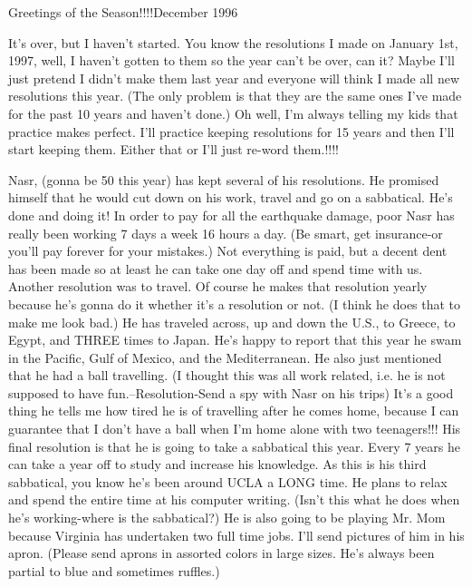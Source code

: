 
%

Greetings of the Season!!!!\hfill December 1996


It's over, but I haven't started. You know the resolutions I made on January 1st, 1997, well, I haven't gotten to them so the year can't be
over, can it? Maybe I'll just pretend I didn't make them last year and everyone will think I made all new resolutions this year. (The only
problem is that they are the same ones I've made for the past 10 years and haven't done.) Oh well, I'm always telling my kids that practice
makes perfect. I'll practice keeping resolutions for 15 years and then I'll start keeping them. Either that or I'll just re-word them.!!!!

Nasr, (gonna be 50 this year) has kept several of his resolutions. He promised himself that he would cut down on his work, travel and go on a
sabbatical. He's done and doing it! In order to pay for all the earthquake damage, poor Nasr has really been working 7 days a week 16 hours a
day. (Be smart, get insurance-or you'll pay forever for your mistakes.) Not everything is paid, but a decent dent has been made so at least he
can take one day off and spend time with us. Another resolution was to travel. Of course he makes that resolution yearly because he's gonna do
it whether it's a resolution or not. (I think he does that to make me look bad.) He has traveled across, up and down the U.S., to Greece, to
Egypt, and THREE times to Japan. He's happy to report that this year he swam in the Pacific, Gulf of Mexico, and the Mediterranean. He also just
mentioned that he had a ball travelling. (I thought this was all work related, i.e. he is not supposed to have fun.--Resolution-Send a spy with
Nasr on his trips) It's a good thing he tells me how tired he is of travelling after he comes home, because I can guarantee that I don't have a
ball when I'm home alone with two teenagers!!! His final resolution is that he is going to take a sabbatical this year. Every 7 years he can
take a year off to study and increase his knowledge. As this is his third sabbatical, you know he's been around UCLA a LONG time. He plans to
relax and spend the entire time at his computer writing. (Isn't this what he does when he's working-where is the sabbatical?) He is also going
to be playing Mr. Mom because Virginia has undertaken two full time jobs. I'll send pictures of him in his apron. (Please send aprons in
assorted colors in large sizes. He's always been partial to blue and sometimes ruffles.)

